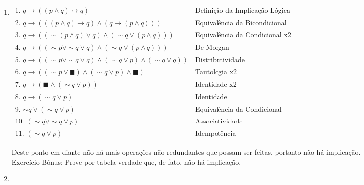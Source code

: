 \documentclass[12pt, a4paper,final]{article}
\begin{document}
\begin{enumerate}
\begin{enumerate}[label=(\alph*)]
            \item 
            
                \begin{tabular}{ll}
                    1. $q \rightarrow ((p \wedge q) \leftrightarrow q)$& Definição da Implicação Lógica \\
                    2. $q \rightarrow (((p \wedge q)\rightarrow q) \wedge (q \rightarrow (p \wedge q)))$ & Equivalência da Bicondicional \\
                    3. $q \rightarrow ((\sim(p \wedge q) \vee q) \wedge (\sim q \vee (p \wedge q)))$ & Equivalência da Condicional x2 \\
                    4. $q \rightarrow ((\sim p \vee \sim q \vee q) \wedge (\sim q \vee (p \wedge q)))$ & De Morgan \\
                    5. $q \rightarrow ((\sim p \vee \sim q \vee q) \wedge (\sim q \vee p) \wedge (\sim q \vee q))$ & Distributividade \\
                    6. $q \rightarrow ((\sim p \vee \blacksquare) \wedge (\sim q \vee p) \wedge \blacksquare)$ & Tautologia x2 \\
                    7. $q \rightarrow (\blacksquare \wedge (\sim q \vee p))$ & Identidade x2 \\
                    8. $q \rightarrow (\sim q \vee p)$ & Identidade \\
                    9. $\sim q \vee (\sim q \vee p)$ & Equivalência da Condicional \\
                    10. $(\sim q \vee \sim q \vee p)$ & Associatividade \\
                    11. $(\sim q \vee p)$ & Idempotência \\
                \end{tabular}
            
            \vskip 5mm
            
            Deste ponto em diante não há mais operações não redundantes que possam ser feitas, portanto não há implicação.\\
            Exercício Bônus: Prove por tabela verdade que, de fato, não há implicação.
            
            \vskip 5mm

            \item 
            

\end{enumerate}
\end{enumerate}
\end{document}
